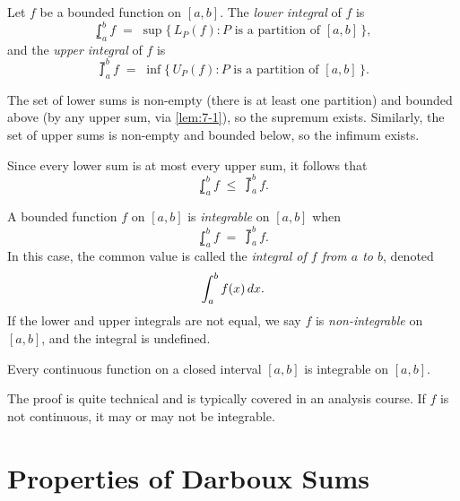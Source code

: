 \begin{definition}
\label{def:7-10}
Let $f$ be a bounded function on $[a,b]$.  The \emph{lower integral} of $f$ is
\[
  \lowint_{a}^{b} f \;=\; \sup\bigl\{\, L_P(f) : P \text{ is a partition of } [a,b] \,\bigr\},
\]
and the \emph{upper integral} of $f$ is
\[
  \upint_{a}^{b} f \;=\; \inf\bigl\{\, U_P(f) : P \text{ is a partition of } [a,b] \,\bigr\}.
\]
\end{definition}

\begin{remark}
The set of lower sums is non-empty (there is at least one partition) and bounded above (by any upper sum, via \cref{lem:7-1}), so the supremum exists.  Similarly, the set of upper sums is non-empty and bounded below, so the infimum exists.
\end{remark}

Since every lower sum is at most every upper sum, it follows that
\[
  \lowint_{a}^{b} f \;\le\; \upint_{a}^{b} f.
\]

\begin{definition}[Integrability]
\label{def:7-11}
A bounded function $f$ on $[a,b]$ is \emph{integrable} on $[a,b]$ when
\[
  \lowint_{a}^{b} f \;=\; \upint_{a}^{b} f.
\]
In this case, the common value is called the \emph{integral of $f$ from $a$ to $b$}, denoted
\[
  \int_{a}^{b} f(x)\,dx.
\]
If the lower and upper integrals are not equal, we say $f$ is \emph{non-integrable} on $[a,b]$, and the integral is undefined.
\end{definition}

\begin{theorem}
\label{thm:7-5}
Every continuous function on a closed interval $[a,b]$ is integrable on $[a,b]$.
\end{theorem}

\begin{remark}
The proof is quite technical and is typically covered in an analysis course.  If $f$ is not continuous, it may or may not be integrable.
\end{remark}

\section{Properties of Darboux Sums}
\label{sec:7.6}

